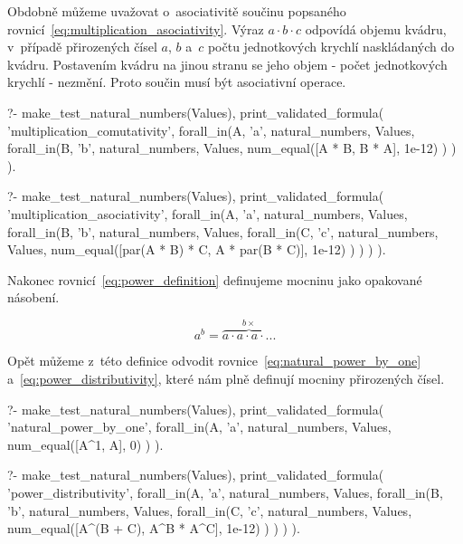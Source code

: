 Obdobně můžeme uvažovat o~asociativitě součinu popsaného rovnicí~\eqref{eq:multiplication_asociativity}. Výraz \(a \cdot b \cdot c\) odpovídá objemu kvádru, v~případě přirozených čísel \(a\), \(b\) a~\(c\) počtu jednotkových krychlí naskládaných do kvádru. Postavením kvádru na jinou stranu se jeho objem - počet jednotkových krychlí - nezmění. Proto součin musí být asociativní operace.

\begin{fact}
\begin{prolog}
?-	make_test_natural_numbers(Values),
	print_validated_formula(
		'multiplication_comutativity',
		forall_in(A, 'a', natural_numbers, Values,
			forall_in(B, 'b', natural_numbers, Values,
				num_equal([A * B, B * A], 1e-12)
			)
		)
	).				
\end{prolog}
\begin{prolog}
?-	make_test_natural_numbers(Values),
	print_validated_formula(
		'multiplication_asociativity',
		forall_in(A, 'a', natural_numbers, Values,
			forall_in(B, 'b', natural_numbers, Values,
				forall_in(C, 'c', natural_numbers, Values,
					num_equal([par(A * B) * C, A * par(B * C)], 1e-12)
				)
			)
		)
	).				
\end{prolog}
\end{fact}

Nakonec rovnicí~\eqref{eq:power_definition} definujeme mocninu jako opakované násobení.

\begin{equation}
\label{eq:power_definition}
a^b = \overbrace{a \cdot a \cdot a \cdot ...}^{b \times}
\end{equation}

Opět můžeme z~této definice odvodit rovnice~\eqref{eq:natural_power_by_one} a~\eqref{eq:power_distributivity}, které nám plně definují mocniny přirozených čísel.

\begin{fact}
\begin{prolog}
?-	make_test_natural_numbers(Values),
	print_validated_formula(
		'natural_power_by_one',
		forall_in(A, 'a', natural_numbers, Values,
			num_equal([A^1, A], 0)
		)
	).				
\end{prolog}
\begin{prolog}
?-	make_test_natural_numbers(Values),
	print_validated_formula(
		'power_distributivity',
		forall_in(A, 'a', natural_numbers, Values,
			forall_in(B, 'b', natural_numbers, Values,
				forall_in(C, 'c', natural_numbers, Values,
					num_equal([A^(B + C), A^B * A^C], 1e-12)
				)
			)
		)
	).				
\end{prolog}
\end{fact}

